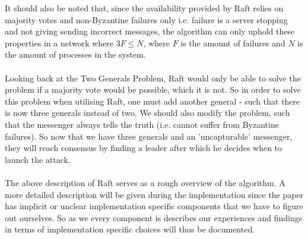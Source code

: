 It should also be noted that, since the availability provided by Raft relies on majority votes and non-Byzantine failures only i.e. failure is a server stopping and not giving sending incorrect messages, the algorithm can only uphold these properties in a network where $3F \leq N$, where $F$ is the amount of failures and $N$ is the amount of processes in the system.
\\ \\
Looking back at the Two Generals Problem, Raft would only be able to solve the problem if a majority vote would be possible, which it is not. So in order to solve this problem when utilising Raft, one must add another general - such that there is now three generals instead of two. We should also modify the problem, such that the messenger always tells the truth (i.e. cannot suffer from Byzantine failures). So now that we have three generals and an 'uncapturable' messenger, they will reach consensus by finding a leader after which he decides when to launch the attack.
\\ \\
The above description of Raft serves as a rough overview of the algorithm. A more detailed description will be given during the implementation since the paper has implicit or unclear implementation specific components that we have to figure out ourselves. So as we every component is describes our experiences and findings in terms of implementation specific choices will thus be documented.